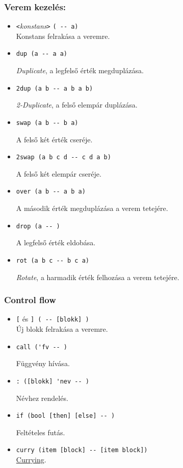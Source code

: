 \documentclass[a4paper]{article}
\begin{document}
\subsubsection*{Verem kezelés: }
\begin{itemize}
\item \verb|<|{\it konstans}\verb|>| \verb|( -- a)|\\ Konstans felrakása a veremre.
\item \begin{verbatim}dup (a -- a a)\end{verbatim} {\it Duplicate}, a legfelső érték megduplázása.
\item \begin{verbatim}2dup (a b -- a b a b)\end{verbatim} {\it 2-Duplicate}, a felső elempár duplázása.
\item \begin{verbatim}swap (a b -- b a)\end{verbatim} A felső két érték cseréje.
\item \begin{verbatim}2swap (a b c d -- c d a b)\end{verbatim} A felső két elempár cseréje.
\item \begin{verbatim}over (a b -- a b a)\end{verbatim} A második érték megduplázása a verem tetejére.
\item \begin{verbatim}drop (a -- )\end{verbatim} A legfelső érték eldobása.
\item \begin{verbatim}rot (a b c -- b c a)\end{verbatim} {\it Rotate}, a harmadik érték felhozása a verem tetejére.
\end{itemize}

\subsubsection*{Control flow}
\begin{itemize}
	\item \verb|[| és \verb|] ( -- [blokk] )|\\Új blokk felrakása a veremre.
	\item \begin{verbatim}call ('fv -- )\end{verbatim} Függvény hívása.
	\item \begin{verbatim}: ([blokk] 'nev -- )\end{verbatim} Névhez rendelés.
	\item \begin{verbatim}if (bool [then] [else] -- )\end{verbatim} Feltételes futás.
	\item \verb|curry (item [block] -- [item block])|\\ \href{https://en.wikipedia.org/wiki/Currying}{Currying}.
\end{itemize}
\end{document}
